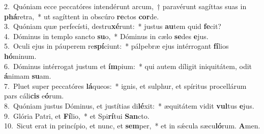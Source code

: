 {2.~}Quóniam ecce peccatóres intendérunt arcum,~† paravérunt sagíttas suas in \textbf{phá}retra,~* ut sagíttent in obscúro \textbf{re}ctos \textbf{cor}de.\\
{3.~}Quóniam quæ perfecísti, destru\textbf{xé}runt:~* justus \textbf{au}tem quid \textbf{fe}cit?\\
{4.~}Dóminus in templo sancto \textbf{su}o,~* Dóminus in cælo \textbf{se}des \textbf{e}jus.\\
{5.~}Oculi ejus in páuperem re\textbf{spí}ciunt:~* pálpebræ ejus intérrogant \textbf{fí}lios \textbf{hó}minum.\\
{6.~}Dóminus intérrogat justum et \textbf{ím}pium:~* qui autem díligit iniquitátem, odit \textbf{á}nimam \textbf{su}am.\\
{7.~}Pluet super peccatóres \textbf{lá}queos:~* ignis, et sulphur, et spíritus procellárum pars cáli\textbf{cis} e\textbf{ó}rum.\\
{8.~}Quóniam justus Dóminus, et justítias di\textbf{lé}xit:~* æquitátem vidit \textbf{vul}tus \textbf{e}jus.\\
{9.~}Glória Patri, et \textbf{Fí}lio,~* et Spi\textbf{rí}tui \textbf{San}cto.\\
{10.~}Sicut erat in princípio, et nunc, et \textbf{sem}per,~* et in sǽcula sæcu\textbf{ló}rum. \textbf{A}men.\\

